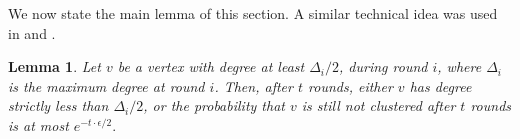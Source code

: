 \documentclass{article} %
\newtheorem{lem}{Lemma}
\begin{document}
We now state the main lemma of this section.
A similar technical idea was used in \cite{1} and \cite{1}. 
\begin{lem}
Let $v$ be a vertex with degree at least 
$\Delta_i/2$, during round $i$, where $\Delta_i$ is the maximum degree at round $i$.
Then, after $t$ rounds, either $v$ has degree strictly less than $\Delta_i/2$, or the probability that $v$ is still not clustered after $t$ rounds is at most
$e^{-t\cdot \epsilon /2}.$
\end{lem}
\end{document}

